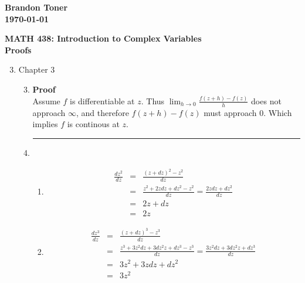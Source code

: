 \documentclass{article}%
\newenvironment{proof}[1][]{\begin{samepage}\textbf{Proof #1} }{\rule{0.5em}{0.5em} \end{samepage}}
\begin{document}
\begin{flushright}
\textbf{Brandon Toner \\
\today}
\end{flushright}

\begin{center}
\textbf{MATH 438: Introduction to Complex Variables \\
Proofs} \\
\end{center}

\begin{enumerate}
    \setcounter{enumi}{2}
    \item Chapter 3
    \begin{enumerate}[label*=\arabic*.]
        \setcounter{enumii}{2}
        \item %
        \begin{proof}\\
            Assume $f$ is differentiable at $z$. Thus $\lim_{h\to 0} \frac{f(z+h)-f(z)}{h}$ does not approach $\infty$, and therefore $f(z+h)-f(z)$ must approach $0$. Which implies $f$ is continous at $z$.
        \end{proof}
        \setcounter{enumii}{9}
        \item %
        \begin{enumerate}[label=(\alph*)]
            \item %
            \begin{eqnarray*}
                \frac{d z^2}{dz} &=& \frac{(z+dz)^2 -z^2}{dz} \\
                                 &=& \frac{z^2+2zdz+dz^2-z^2}{dz} = \frac{2zdz+dz^2}{dz} \\
                                 &=& 2z+dz \\
                                 &=& 2z
            \end{eqnarray*}
            \item %
            \begin{eqnarray*}
                \frac{d z^3}{dz} &=& \frac{(z+dz)^3 -z^3}{dz} \\
                                 &=& \frac{z^3+3z^2dz+3dz^2z+dz^3-z^3}{dz} = \frac{3z^2dz+3dz^2z+dz^3}{dz} \\
                                 &=& 3z^2+3zdz+dz^2\\
                                 &=& 3z^2
            \end{eqnarray*}
        \end{enumerate}

\end{enumerate}
\end{enumerate}
\end{document}
